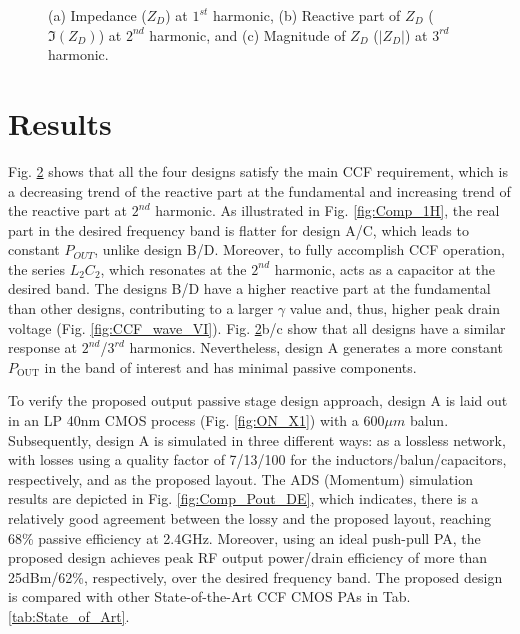 \documentclass[conference]{IEEEtran}
\begin{document}
\begin{figure}[!t]
\begin{subfigure}{0.24\textwidth}
		\caption{}
		\label{fig:Comp_3H_Mag}
	\end{subfigure}
	\caption{(a) Impedance ($Z_D$) at $1^{st}$ harmonic, (b) Reactive part of $Z_D$ ($\Im(Z_D)$) at $2^{nd}$ harmonic, and (c) Magnitude of $Z_D$ ($|Z_D|$) at $3^{rd}$ harmonic.}
	\label{fig:Comp_1H_2H_3H}
	\vspace{-0.1in}
\end{figure}

\section{Results}
\label{section:Results}

Fig. \ref{fig:Comp_1H_2H_3H} shows that all the four designs satisfy the main CCF requirement, which is a decreasing trend of the reactive part at the fundamental and increasing trend of the reactive part at $2^{nd}$ harmonic. As illustrated in Fig. \ref{fig:Comp_1H}, the real part in the desired frequency band is flatter for design A/C, which leads to constant $P_{OUT}$, unlike design B/D. Moreover, to fully accomplish CCF operation, the series $L_2C_2$, which resonates at the $2^{nd}$ harmonic, acts as a capacitor at the desired band. The designs B/D have a higher reactive part at the fundamental than other designs, contributing to a larger $\gamma$ value and, thus, higher peak drain voltage (Fig. \ref{fig:CCF_wave_VI}). Fig. \ref{fig:Comp_1H_2H_3H}b/c show that all designs have a similar response at $2^{nd}$/$3^{rd}$ harmonics. Nevertheless, design A generates a more constant $P_{\text{OUT}}$ in the band of interest and has minimal passive components. 

To verify the proposed output passive stage design approach,  design A is laid out in an LP 40nm CMOS process (Fig. \ref{fig:ON_X1}) with a 600$\mu m$ balun. Subsequently, design A is simulated in three different ways: as a lossless network, with losses using a quality factor of 7/13/100 for the inductors/balun/capacitors, respectively, and as the proposed layout. The ADS (Momentum) simulation results are depicted in Fig. \ref{fig:Comp_Pout_DE}, which indicates, there is a relatively good agreement between the lossy and the proposed layout, reaching 68\% passive efficiency at 2.4GHz. Moreover, using an ideal push-pull PA, the proposed design achieves peak RF output power/drain efficiency of more than 25dBm/62\%, respectively, over the desired frequency band. The proposed design is compared with other State-of-the-Art CCF CMOS PAs in Tab. \ref{tab:State_of_Art}. 
\end{document}
